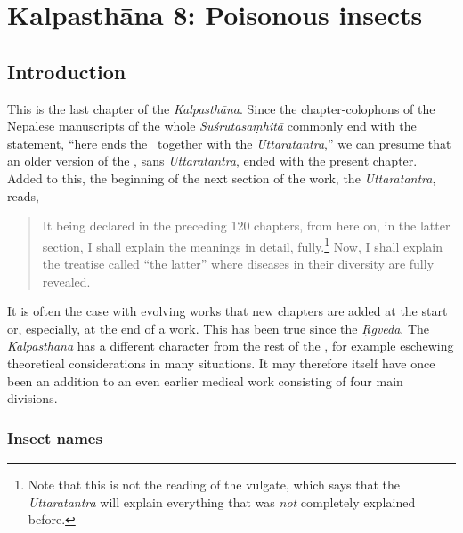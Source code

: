 \chapter{Kalpasthāna 8: Poisonous insects}

\section{Introduction} 

This is the last chapter of the \emph{Kalpasthāna}.  Since the
chapter-colophons of the Nepalese manuscripts of the whole
\emph{Suśrutasaṃhitā} commonly end with the statement, “here ends the
\SS\ together with the \emph{Uttaratantra},” we can presume that an older
version of the \SS, sans \emph{Uttaratantra}, ended with the present chapter.
Added to this, the beginning of the next section of the work, the
\emph{Uttaratantra}, reads,
\begin{quote}
It being declared in the preceding 120
chapters, from here on, in the latter section, I shall explain the
meanings in detail, fully.\footnote{Note that this is not the reading
    of the vulgate, which says that the \emph{Uttaratantra} will explain
    everything that was \emph{not} completely explained before.}  Now, I
    shall explain the treatise called “the latter” where diseases
    in their diversity are fully revealed.
    \end{quote}
It is often the case with evolving works that new chapters are added
at the start or, especially, at the end of a work.  This has been true
since the \emph{Ṛgveda}.  The \emph{Kalpasthāna} has a different character
from the rest of the \SS, for example eschewing theoretical
considerations in many situations.  It may therefore itself have once
been an addition to an even earlier medical work consisting of four main
divisions.

\subsection{Insect names}
\label{insectnames}

